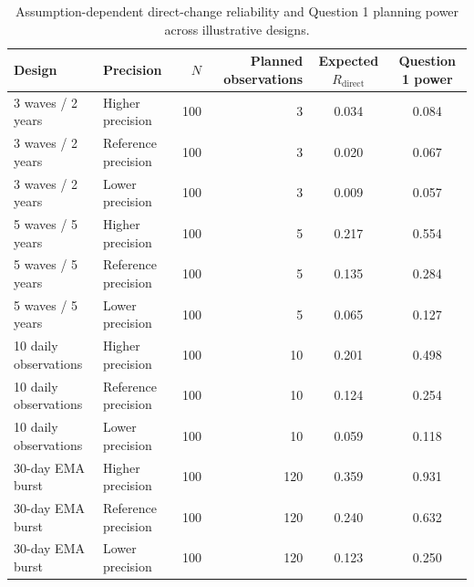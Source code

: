 \begin{table}[htbp]
\centering
\caption{Assumption-dependent direct-change reliability and Question 1 planning power across illustrative designs.}
\label{tab:practical_design_sensitivity}
\begin{tabular}{llrrcc}
\toprule
Design & Precision & $N$ & Planned observations & Expected $R_{\mathrm{direct}}$ & Question 1 power \\
\midrule
3 waves / 2 years & Higher precision & 100 & 3 & 0.034 & 0.084 \\
3 waves / 2 years & Reference precision & 100 & 3 & 0.020 & 0.067 \\
3 waves / 2 years & Lower precision & 100 & 3 & 0.009 & 0.057 \\
5 waves / 5 years & Higher precision & 100 & 5 & 0.217 & 0.554 \\
5 waves / 5 years & Reference precision & 100 & 5 & 0.135 & 0.284 \\
5 waves / 5 years & Lower precision & 100 & 5 & 0.065 & 0.127 \\
10 daily observations & Higher precision & 100 & 10 & 0.201 & 0.498 \\
10 daily observations & Reference precision & 100 & 10 & 0.124 & 0.254 \\
10 daily observations & Lower precision & 100 & 10 & 0.059 & 0.118 \\
30-day EMA burst & Higher precision & 100 & 120 & 0.359 & 0.931 \\
30-day EMA burst & Reference precision & 100 & 120 & 0.240 & 0.632 \\
30-day EMA burst & Lower precision & 100 & 120 & 0.123 & 0.250 \\
\bottomrule
\end{tabular}
\end{table}
